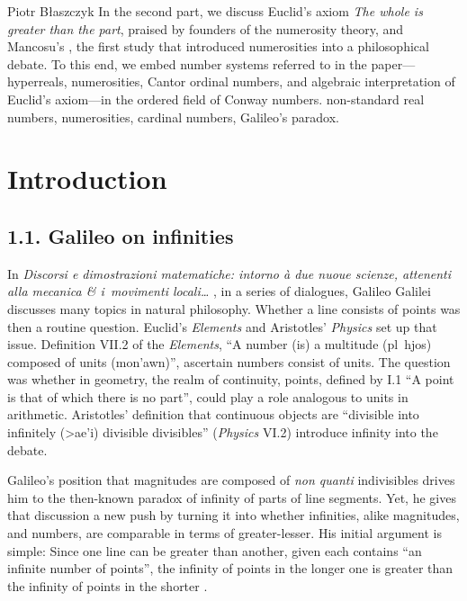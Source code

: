 \begin{artengenv}{Piotr Błaszczyk}
{	In the second part, we discuss  Euclid's axiom \textit{The whole is greater than the part},  praised by founders of the numerosity theory,  and  Mancosu's \parencite*{ref_pm09},  the first study that introduced numerosities into a philosophical debate.  To this end, we embed number systems referred to in the paper---hyperreals, numerosities, Cantor ordinal numbers, and algebraic interpretation of Euclid's axiom---in the ordered field of Conway numbers.}
	{non-standard real numbers, numerosities, cardinal numbers, Galileo's paradox.}






\section{Introduction}
\vspace*{-30pt}
\subsection{1.1. Galileo on infinities}
In  \textit{Discorsi e dimostrazioni matematiche: intorno à due nuoue scienze, attenenti alla mecanica \& i~movimenti locali\ldots{}} \parencite*{ref_GG38}, in a series of dialogues, Galileo Galilei discusses many topics in natural philosophy.  Whether a line consists of  points was then a routine question. 
Euclid's \textit{Elements} and Aristotles' \textit{Physics} set up that issue.  
Definition VII.2 of the \textit{Elements}, ``A number (is) a multitude 
(\foreignlanguage{polutonikogreek}{pl~hjos}) composed of units (\foreignlanguage{polutonikogreek}{mon'awn})'', ascertain numbers consist of units.  
The question was whether in geometry, the realm of continuity, points, defined by  I.1 ``A point is that of which there is no part'', could play a role analogous to units in arithmetic.
 Aristotles'  definition that  continuous objects are ``divisible into  infinitely (\foreignlanguage{polutonikogreek}{>ae'i}) divisible divisibles'' (\textit{Physics} VI.2) introduce infinity into the debate.


Galileo's position that magnitudes are composed of  \textit{non quanti} indivisibles drives him to the then-known paradox of infinity of parts of line segments. Yet, he
gives that discussion  a new push
by turning it into whether infinities, alike magnitudes, and numbers, are comparable in terms of greater-lesser.
His initial argument is simple:
Since one line can be greater than another, given each contains ``an infinite number of points'',  the infinity of points in the longer one is greater than the infinity of points in the shorter \parencite[see][30--33]{ref_GG56}. 


\end{artengenv}
